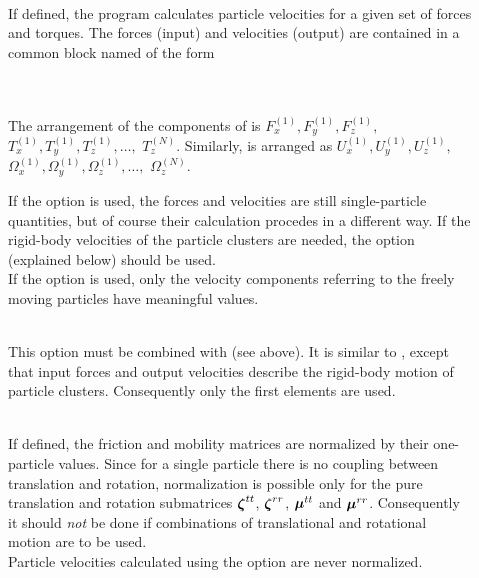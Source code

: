 \begin{description}
\item[]
\\
If defined, the program calculates particle velocities for a given set of
forces and torques. The forces (input) and velocities (output) are
contained in a common block named  of the form\\
\wsp{}\\
\wsp{}\\
\begin{sloppy}
The arrangement of the components of  is
$F_x^{(1)},F_y^{(1)},F_z^{(1)},$ $T_x^{(1)},T_y^{(1)},T_z^{(1)},
\ldots,$ $T_z^{(N)}$. Similarly,  is arranged as
$U_x^{(1)},U_y^{(1)},U_z^{(1)},$ $\Omega_x^{(1)},\Omega_y^{(1)},
\Omega_z^{(1)},\ldots,$ $\Omega_z^{(N)}$.\\
\end{sloppy}
If the option  is used, the forces and velocities are still
single-particle quantities, but of course their calculation procedes
in a different way. If the rigid-body velocities of the particle
clusters are needed, the option  (explained below)
should be used.\\
If the option  is used, only the velocity components
referring to the freely moving particles have meaningful values.

\item[]
\\
This option must be combined with  (see above).
It is similar to
, except that input forces and output velocities 
describe the rigid-body motion of particle clusters. Consequently
only the first  elements are used.

\item[]
\\
If defined, the friction and mobility matrices are normalized by their
one-particle values. Since for a single particle there is no coupling
between translation and rotation, normalization is possible only for
the pure translation and rotation submatrices $\mbox{\boldmath $\zeta$}^{tt}$,
$\mbox{\boldmath $\zeta$}^{rr}$, $\mbox{\boldmath $\mu$}^{tt}$ and $\mbox{\boldmath $\mu$}^{rr}$. Consequently it should
{\em not} be done if combinations of translational and rotational
motion are to be used.\\
Particle velocities calculated using the option  are
never normalized.


\end{description}

